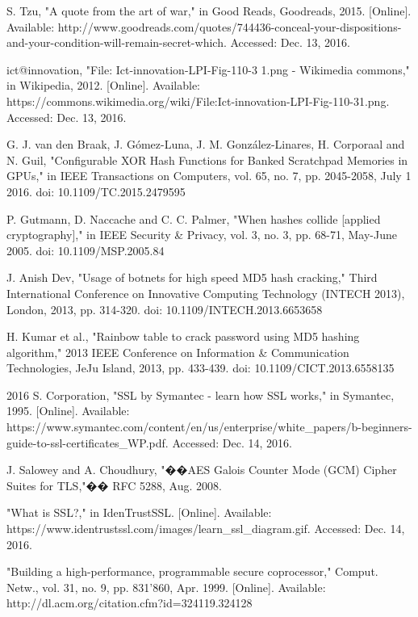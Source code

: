 \documentclass[journal]{IEEEtran}
\begin{document}
\begin{thebibliography}{1}


S. Tzu, "A quote from the art of war," in Good Reads, Goodreads, 2015. [Online]. Available: http://www.goodreads.com/quotes/744436-conceal-your-dispositions-and-your-condition-will-remain-secret-which. Accessed: Dec. 13, 2016.

ict@innovation, "File: Ict-innovation-LPI-Fig-110-3 1.png - Wikimedia commons," in Wikipedia, 2012. [Online]. Available: https://commons.wikimedia.org/wiki/File:Ict-innovation-LPI-Fig-110-31.png. Accessed: Dec. 13, 2016.

G. J. van den Braak, J. Gómez-Luna, J. M. González-Linares, H. Corporaal and N. Guil, "Configurable XOR Hash Functions for Banked Scratchpad Memories in GPUs," in IEEE Transactions on Computers, vol. 65, no. 7, pp. 2045-2058, July 1 2016.
doi: 10.1109/TC.2015.2479595

P. Gutmann, D. Naccache and C. C. Palmer, "When hashes collide [applied cryptography]," in IEEE Security \& Privacy, vol. 3, no. 3, pp. 68-71, May-June 2005.
doi: 10.1109/MSP.2005.84

J. Anish Dev, "Usage of botnets for high speed MD5 hash cracking," Third International Conference on Innovative Computing Technology (INTECH 2013), London, 2013, pp. 314-320.
doi: 10.1109/INTECH.2013.6653658

H. Kumar et al., "Rainbow table to crack password using MD5 hashing algorithm," 2013 IEEE Conference on Information \& Communication Technologies, JeJu Island, 2013, pp. 433-439.
doi: 10.1109/CICT.2013.6558135

2016 S. Corporation, "SSL by Symantec - learn how SSL works," in Symantec, 1995. [Online]. Available: https://www.symantec.com/content/en/us/enterprise/white\_papers/b-beginners-guide-to-ssl-certificates\_WP.pdf. Accessed: Dec. 14, 2016.

J. Salowey and A. Choudhury, "��AES Galois Counter Mode (GCM) Cipher Suites for TLS,"�� RFC 5288, Aug. 2008.

"What is SSL?," in IdenTrustSSL. [Online]. Available: https://www.identrustssl.com/images/learn\_ssl\_diagram.gif. Accessed: Dec. 14, 2016.

"Building a high-performance, programmable secure coprocessor," Comput.
Netw., vol. 31, no. 9, pp. 831'860, Apr. 1999. [Online]. Available:
http://dl.acm.org/citation.cfm?id=324119.324128


\end{thebibliography}
\end{document}
